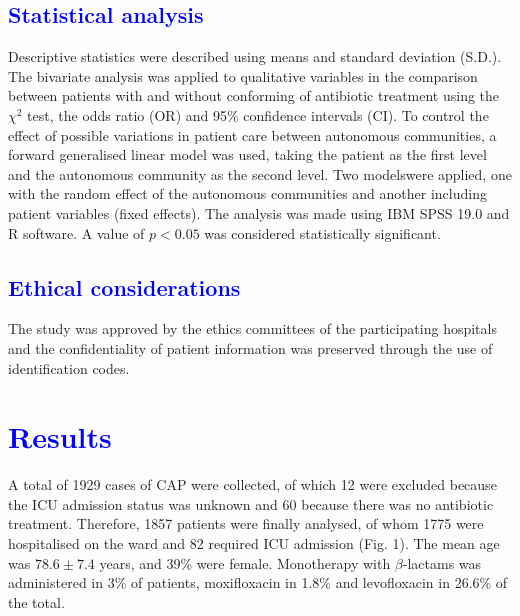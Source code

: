 \documentclass[11pt, a4paper]{article}
\begin{document}
\begin{multicols}{2}
\subsection*{\textcolor{blue}{Statistical analysis}}
Descriptive statistics were described using means and standard deviation (S.D.). The bivariate analysis was applied to qualitative variables in the comparison between patients with and without conforming of antibiotic treatment using the $\chi^{2}$ test, the odds ratio (OR) and 95\% confidence intervals (CI). To control the effect of possible variations in patient care between autonomous communities, a forward generalised linear model was used, taking the patient as the first level and the autonomous community as the second level. Two modelswere applied, one with the random effect of the autonomous communities and another including patient variables (fixed effects). The analysis was made using IBM SPSS 19.0 and R
software. A value of $p< 0.05$ was considered statistically significant.

\subsection*{\textcolor{blue}{Ethical considerations}}
The study was approved by the ethics committees of the participating hospitals and the confidentiality of patient information was preserved through the use of identification codes.

\section*{\textcolor{blue}{Results}}
A total of 1929 cases of CAP were collected, of which 12 were excluded because the ICU admission status was unknown and 60 because there was no antibiotic treatment. Therefore, 1857 patients were finally analysed, of whom 1775 were hospitalised on the ward and 82 required ICU admission (Fig. 1). The mean age was $78.6 \pm 7.4$ years, and 39\% were female. Monotherapy with $\beta$-lactams was administered in 3\% of patients, moxifloxacin in 1.8\% and levofloxacin in 26.6\% of the total.


\end{multicols}
\end{document}
